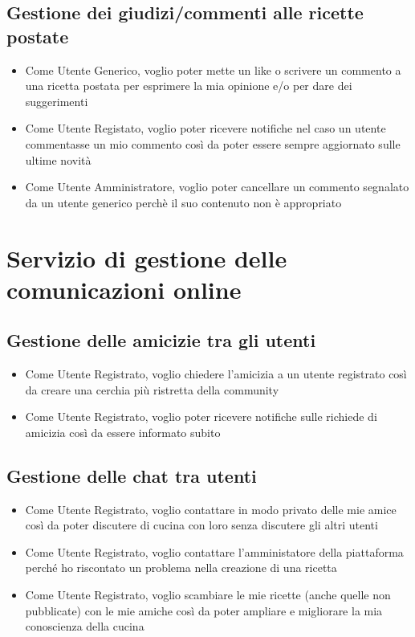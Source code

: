 \documentclass{article}
\begin{document}
\subsection{Gestione dei giudizi/commenti alle ricette postate}
\begin{itemize}
    \item Come Utente Generico, voglio poter mette un like o scrivere un commento a una ricetta postata per 
    esprimere la mia opinione e/o per dare dei suggerimenti
    \item Come Utente Registato, voglio poter ricevere notifiche nel caso un utente commentasse un mio commento 
    così da poter essere sempre aggiornato sulle ultime novità
    \item Come Utente Amministratore, voglio poter cancellare un commento segnalato da un utente generico perchè 
    il suo contenuto non è appropriato 
\end{itemize}

\section{Servizio di gestione delle comunicazioni online}
\subsection{Gestione delle amicizie tra gli utenti}
\begin{itemize}
    \item Come Utente Registrato, voglio chiedere l'amicizia a un utente registrato così da creare una cerchia 
    più ristretta della community
    \item Come Utente Registrato, voglio poter ricevere notifiche sulle richiede di amicizia così da essere 
    informato subito
\end{itemize}

\subsection{Gestione delle chat tra utenti}
\begin{itemize}
    \item Come Utente Registrato, voglio contattare in modo privato delle mie amice così da poter discutere di 
    cucina con loro senza discutere gli altri utenti
    \item Come Utente Registrato, voglio contattare l'amministatore della piattaforma perché ho riscontato un 
    problema nella creazione di una ricetta
    \item Come Utente Registrato, voglio scambiare le mie ricette (anche quelle non pubblicate) con le mie amiche 
    così da poter ampliare e migliorare la mia conoscienza della cucina    
\end{itemize}
\end{document}
